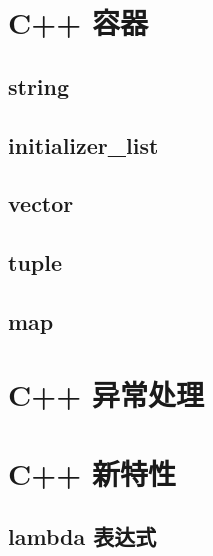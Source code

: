 \documentclass{article}
\begin{document}
	\section{C++ 容器}
	
	\subsection{string}
	
	\subsection{initializer\_list}
	
	\subsection{vector}
	
	
	\subsection{tuple}
	
	\subsection{map}
	


	\section{C++ 异常处理}
	\section{C++ 新特性}
	\subsection{lambda 表达式}
\end{document}
